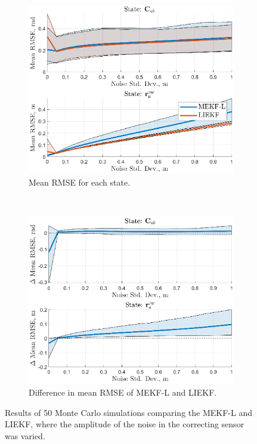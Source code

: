 \begin{figure}
	\centering
	\begin{subfigure}[b]{0.5\textwidth}
		\includegraphics[width=\textwidth]{figs/se3/noise_trials/comp_noise_rmse_state_Corr_L.eps}
		\caption{Mean RMSE for each state.}
	\end{subfigure}
	~
	\begin{subfigure}[b]{0.5\textwidth}
		\includegraphics[width=\textwidth]{figs/se3/noise_trials/comp_noise_diff_state_Corr_L.eps}
		\caption{Difference in mean RMSE of MEKF-L and LIEKF.}
	\end{subfigure}
	\caption[Results comparing the MEKF-L and LIEKF varying correcting sensor noise.]{Results of 50 Monte Carlo simulations comparing the MEKF-L and LIEKF, where the amplitude of the noise in the correcting sensor was varied. }
	\label{fig:comp_noise_corr_L}
\end{figure}


